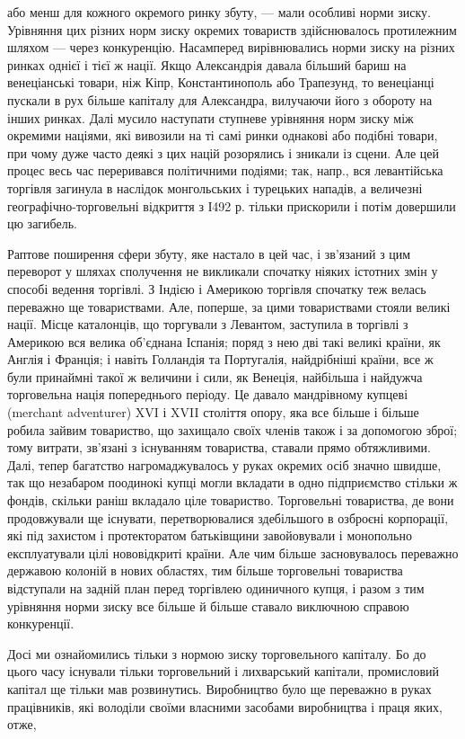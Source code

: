 \parcont{}  %
або менш для кожного окремого ринку збуту, — мали особливі норми зиску. Урівняння цих різних норм зиску окремих товариств здійснювалось протилежним шляхом — через конкуренцію. Насамперед вирівнювались норми зиску на різних ринках однієї і тієї ж
нації. Якщо Александрія давала більший бариш на венеціанські товари, ніж Кіпр, Константинополь або Трапезунд, то венеціанці
пускали в рух більше капіталу для Александра, вилучаючи його з обороту на інших ринках. Далі мусило наступати ступневе
урівняння норм зиску між окремими націями, які вивозили на ті самі ринки однакові або подібні товари, при чому дуже часто
деякі з цих націй розорялись і зникали із сцени. Але цей процес весь час переривався політичними подіями; так, напр., вся
левантійська торгівля загинула в наслідок монгольських і турецьких нападів, а величезні географічно-торговельні відкриття з
І492 р. тільки прискорили і потім довершили цю загибель.

Раптове поширення сфери збуту, яке настало в цей час, і зв’язаний з
цим переворот у шляхах сполучення не викликали спочатку ніяких істотних змін у способі ведення торгівлі. З Індією і Америкою
торгівля спочатку теж велась переважно ще товариствами. Але, поперше, за цими товариствами стояли великі нації. Місце
каталонців, що торгували з Левантом, заступила в торгівлі з Америкою вся велика об’єднана Іспанія; поряд з нею дві такі
великі країни, як Англія і Франція; і навіть Голландія та Португалія, найдрібніші країни, все ж були принаймні такої ж
величини і сили, як Венеція, найбільша і найдужча торговельна нація попереднього періоду. Це давало мандрівному купцеві (merchant adventurer) XVI і XVII століття опору, яка все більше і більше робила зайвим товариство, що захищало своїх членів
також і за допомогою зброї; тому витрати, зв’язані з існуванням товариства, ставали прямо обтяжливими. Далі, тепер багатство
нагромаджувалось у руках окремих осіб значно швидше, так що незабаром поодинокі купці могли вкладати в одно підприємство
стільки ж фондів, скільки раніш вкладало ціле товариство. Торговельні товариства, де вони продовжували ще існувати,
перетворювалися здебільшого в озброєні корпорації, які під захистом і протекторатом батьківщини завойовували і монопольно
експлуатували цілі нововідкриті країни. Але чим більше засновувалось переважно державою колоній в нових областях, тим більше
торговельні товариства відступали на задній план перед торгівлею одиничного купця, і разом з тим урівняння норми зиску все
більше й більше ставало виключною справою конкуренції.

Досі ми ознайомились тільки з нормою зиску торговельного капіталу. Бо
до цього часу існували тільки торговельний і лихварський капітали, промисловий капітал ще тільки мав розвинутись.
Виробництво було ще переважно в руках працівників, які володіли своїми власними засобами виробництва і праця яких, отже,
\parbreak{}  %
